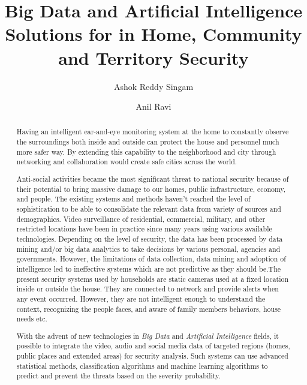 \documentclass[sigconf]{acmart}
\begin{document}
\title{Big Data and Artificial Intelligence Solutions for in Home, Community and Territory Security}


\author{Ashok Reddy Singam}

\author{Anil Ravi}

\begin{abstract}
Having an intelligent ear-and-eye monitoring system at the home to constantly observe the surroundings both inside and outside can protect the house and personnel much more safer way. By extending this capability to the neighborhood and city through networking and collaboration would create safe cities across the world.

Anti-social activities became the most significant threat to national security because of their potential to bring massive damage to our homes, public infrastructure, economy, and people. The existing systems and methods haven't reached the level of sophistication to be able to consolidate the relevant data from variety of sources and demographics. Video surveillance of residential, commercial, military, and other restricted locations have been in practice since many years using various available technologies. Depending on the level of security, the data has been processed by data mining and/or big data analytics to take decisions by various personal, agencies and governments. However, the limitations of data collection, data mining and adoption of intelligence led to ineffective systems which are not predictive as they should be.The present security systems used by households are static cameras used at a  fixed location inside or outside the house. They are connected to network and provide alerts when any event occurred. However, they are not intelligent enough to understand the context, recognizing the people faces, and aware of family members behaviors, house needs etc.

With the advent of new technologies in \textit{Big Data} and \textit{Artificial Intelligence} fields, it possible to integrate the video, audio and social media data of targeted regions (homes, public places and extended areas) for security analysis. Such systems can use advanced statistical methods, classification algorithms and machine learning algorithms to predict and prevent the threats based on the severity probability.

\end{abstract}
\end{document}
